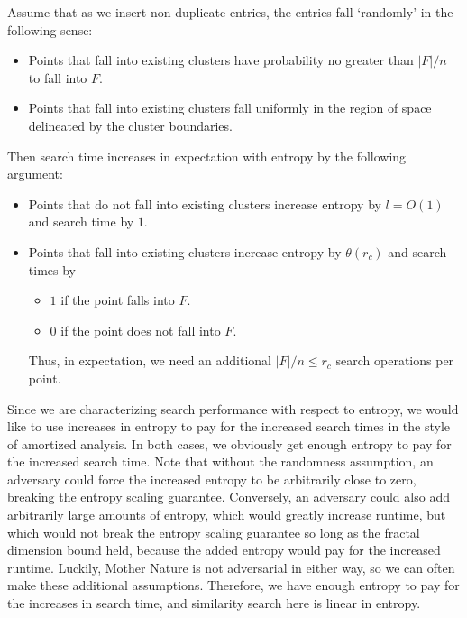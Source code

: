 \documentclass{amsbook}
\theoremstyle{definition}
\theoremstyle{remark}
\numberwithin{equation}{section}
\begin{document}
Assume that as we insert non-duplicate entries, the entries fall `randomly' in the following sense:
\begin{itemize}
    \item Points that fall into existing clusters have probability no greater than $|F|/n$ to fall into $F$.
    \item Points that fall into existing clusters fall uniformly in the region of space delineated by the cluster boundaries.
\end{itemize}
Then search time increases in expectation with entropy by the following argument:
\begin{itemize}
    \item Points that do not fall into existing clusters increase entropy by $l = O(1)$  and search time by $1$.
    \item Points that fall into existing clusters increase entropy by $\theta(r_c)$ and search times by
        \begin{itemize}
            \item $1$ if the point falls into $F$.
            \item $0$ if the point does not fall into $F$.
        \end{itemize}
        Thus, in expectation, we need an additional $|F|/n \le r_c$ search operations per point.
\end{itemize}

Since we are characterizing search performance with respect to entropy, we would like to use increases in entropy to pay for the increased search times in the style of amortized analysis.
In both cases, we obviously get enough entropy to pay for the increased search time.
Note that without the randomness assumption, an adversary could force the increased entropy to be arbitrarily close to zero, breaking the entropy scaling guarantee.
Conversely, an adversary could also add arbitrarily large amounts of entropy, which would greatly increase runtime, but which would not break the entropy scaling guarantee so long as the fractal dimension bound held, because the added entropy would pay for the increased runtime.
Luckily, Mother Nature is not adversarial in either way, so we can often make these additional assumptions. 
Therefore, we have enough entropy to pay for the increases in search time, and similarity search here is linear in entropy.
\end{document}
